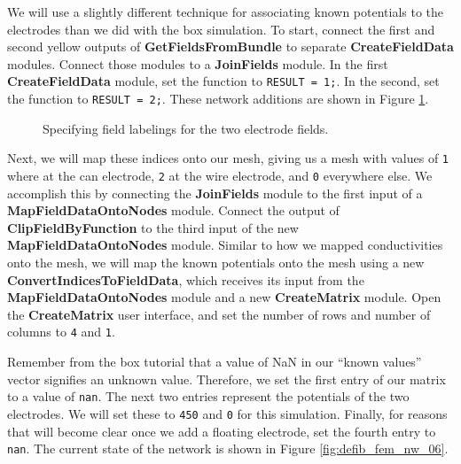 \documentclass[fleqn,11pt,openany]{book}
\begin{document}
We will use a slightly different technique for associating known
potentials to the electrodes than we did with the box simulation. To
start, connect the first and second yellow outputs of {\bf
GetFieldsFromBundle} to separate {\bf CreateFieldData}
modules. Connect those modules to a {\bf JoinFields} module. In the
first {\bf CreateFieldData} module, set the function to {\tt RESULT =
1;}. In the second, set the function to {\tt RESULT = 2;}. These
network additions are shown in Figure \ref{fig:defib_fem_nw_05}.

\begin{figure}
\caption{Specifying field labelings for the two electrode
fields.}\label{fig:defib_fem_nw_05}
\end{figure}

Next, we will map these indices onto our mesh, giving us a mesh with
values of {\tt 1} where at the can electrode, {\tt 2} at the wire
electrode, and {\tt 0} everywhere else. We accomplish this by
connecting the {\bf JoinFields} module to the first input of a {\bf
MapFieldDataOntoNodes} module. Connect the output of {\bf
ClipFieldByFunction} to the third input of the new {\bf
MapFieldDataOntoNodes} module. Similar to how we mapped conductivities
onto the mesh, we will map the known potentials onto the mesh using a
new {\bf ConvertIndicesToFieldData}, which receives its input from the
{\bf MapFieldDataOntoNodes} module and a new {\bf CreateMatrix}
module. Open the {\bf CreateMatrix} user interface, and set the number
of rows and number of columns to {\tt 4} and {\tt 1}.

Remember from the box tutorial that a value of NaN in our ``known
values'' vector signifies an unknown value. Therefore, we set the
first entry of our matrix to a value of {\tt nan}. The next two
entries represent the potentials of the two electrodes. We will set
these to {\tt 450} and {\tt 0} for this simulation. Finally, for
reasons that will become clear once we add a floating electrode, set
the fourth entry to {\tt nan}. The current state of the network is
shown in Figure \ref{fig:defib_fem_nw_06}.
\end{document}
